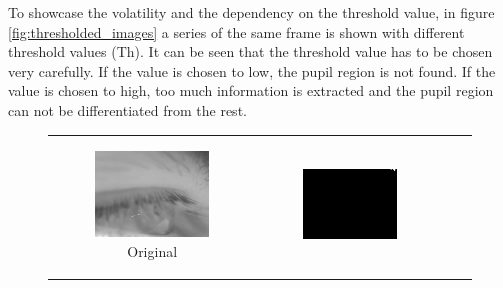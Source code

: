 To showcase the volatility and the dependency on the threshold value, in figure \ref{fig:thresholded_images} a series of the same frame is shown with different threshold values (Th). It can be seen that the threshold value has to be chosen very carefully. If the value is chosen to low, the pupil region is not found. If the value is chosen to high, too much information is extracted and the pupil region can not be differentiated from the rest. 


\begin{figure}[htbp]
    \centering
    \begin{tabular}{cccc}
    \begin{subfigure}{0.2\linewidth}
    \centering
    \includegraphics[width=\linewidth]{plots/thresholding/thresholded_eyelid.jpg}
    \caption{Original}
    \end{subfigure} &
    \begin{subfigure}{0.2\linewidth}
    \centering
    \includegraphics[width=\linewidth]{plots/thresholding/th1}

\end{subfigure}
\end{tabular}
\end{figure}
